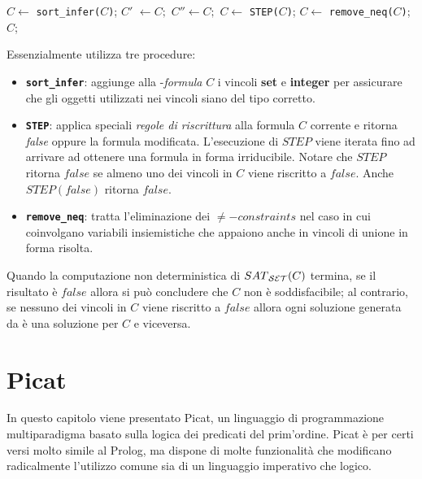 \documentclass[12pt,a4paper,openright]{book} %
\begin{document}
\begin{algorithm}
\begin{algorithmic}[1]
\Procedure{\satset{}}{}
\State $C \gets $ \texttt{sort\_infer($C$)};
\Repeat
\State $C'$ $\gets C;$
\Repeat
\State $C'' \gets C;$
\State $C \gets $ \texttt{STEP($C$)};
\State $C \gets $ \texttt{remove\_neq($C$)};
\State
\State\Return $C$;
\EndProcedure
\end{algorithmic}
\end{algorithm}

Essenzialmente \satset{} utilizza tre procedure:

\begin{itemize}
\item \textbf{\texttt{sort\_infer}}: aggiunge alla \calset{}-\textit{formula} $C$ i vincoli \textbf{set} e \textbf{integer} per assicurare che gli oggetti utilizzati nei vincoli siano del tipo corretto.
    
\item \textbf{\texttt{STEP}}: applica speciali \textit{regole di riscrittura} alla formula $C$ corrente e ritorna \textit{false} oppure la formula modificata. L'esecuzione di $STEP$ viene iterata fino ad arrivare ad ottenere una formula in forma irriducibile. Notare che $STEP$ ritorna $false$ se almeno uno dei vincoli in $C$ viene riscritto a $false$. Anche $STEP(false)$ ritorna $false$.
    
\item \textbf{\texttt{remove\_neq}}: tratta l'eliminazione dei $\neq-constraints$ nel caso in cui coinvolgano variabili insiemistiche che appaiono anche in vincoli di unione in forma risolta.
\end{itemize}

Quando la computazione non deterministica di $SAT\textsubscript{\ensuremath{\mathcal{S}}\ensuremath{\mathcal{E}}\ensuremath{\mathcal{T}}}{}(C)$ termina, se il risultato è $false$ allora si può concludere che $C$ non è soddisfacibile; al contrario, se nessuno dei vincoli in $C$ viene riscritto a $false$ allora ogni soluzione generata da \satset{} è una soluzione per $C$ e viceversa.


\chapter{Picat}
\label{ch:picat}

\minitoc

In questo capitolo viene presentato Picat, un linguaggio di programmazione multiparadigma basato sulla logica dei predicati del prim'ordine. Picat è per certi versi molto simile al Prolog, ma dispone di molte funzionalità che modificano radicalmente l'utilizzo comune sia di un linguaggio imperativo che logico.
\end{document}
